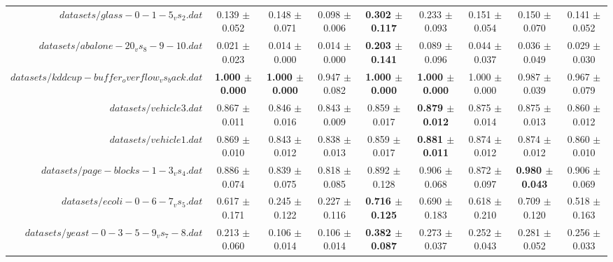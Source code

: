 \begin{table}[!ht]
{\begin{tabular}{r c c c c c c c c}
$datasets/glass-0-1-5_vs_2.dat$ & 0.139 $\pm$ 0.052 & 0.148 $\pm$ 0.071 & 0.098 $\pm$ 0.006 & \textbf{0.302 $\pm$ 0.117} & 0.233 $\pm$ 0.093 & 0.151 $\pm$ 0.054 & 0.150 $\pm$ 0.070 & 0.141 $\pm$ 0.052 \\
$datasets/abalone-20_vs_8-9-10.dat$ & 0.021 $\pm$ 0.023 & 0.014 $\pm$ 0.000 & 0.014 $\pm$ 0.000 & \textbf{0.203 $\pm$ 0.141} & 0.089 $\pm$ 0.096 & 0.044 $\pm$ 0.037 & 0.036 $\pm$ 0.049 & 0.029 $\pm$ 0.030 \\
$datasets/kddcup-buffer_overflow_vs_back.dat$ & \textbf{1.000 $\pm$ 0.000} & \textbf{1.000 $\pm$ 0.000} & 0.947 $\pm$ 0.082 & \textbf{1.000 $\pm$ 0.000} & \textbf{1.000 $\pm$ 0.000} & 1.000 $\pm$ 0.000 & 0.987 $\pm$ 0.039 & 0.967 $\pm$ 0.079 \\
$datasets/vehicle3.dat$ & 0.867 $\pm$ 0.011 & 0.846 $\pm$ 0.016 & 0.843 $\pm$ 0.009 & 0.859 $\pm$ 0.017 & \textbf{0.879 $\pm$ 0.012} & 0.875 $\pm$ 0.014 & 0.875 $\pm$ 0.013 & 0.860 $\pm$ 0.012 \\
$datasets/vehicle1.dat$ & 0.869 $\pm$ 0.010 & 0.843 $\pm$ 0.012 & 0.838 $\pm$ 0.013 & 0.859 $\pm$ 0.017 & \textbf{0.881 $\pm$ 0.011} & 0.874 $\pm$ 0.012 & 0.874 $\pm$ 0.012 & 0.860 $\pm$ 0.010 \\
$datasets/page-blocks-1-3_vs_4.dat$ & 0.886 $\pm$ 0.074 & 0.839 $\pm$ 0.075 & 0.818 $\pm$ 0.085 & 0.892 $\pm$ 0.128 & 0.906 $\pm$ 0.068 & 0.872 $\pm$ 0.097 & \textbf{0.980 $\pm$ 0.043} & 0.906 $\pm$ 0.069 \\
$datasets/ecoli-0-6-7_vs_5.dat$ & 0.617 $\pm$ 0.171 & 0.245 $\pm$ 0.122 & 0.227 $\pm$ 0.116 & \textbf{0.716 $\pm$ 0.125} & 0.690 $\pm$ 0.183 & 0.618 $\pm$ 0.210 & 0.709 $\pm$ 0.120 & 0.518 $\pm$ 0.163 \\
$datasets/yeast-0-3-5-9_vs_7-8.dat$ & 0.213 $\pm$ 0.060 & 0.106 $\pm$ 0.014 & 0.106 $\pm$ 0.014 & \textbf{0.382 $\pm$ 0.087} & 0.273 $\pm$ 0.037 & 0.252 $\pm$ 0.043 & 0.281 $\pm$ 0.052 & 0.256 $\pm$ 0.033 \\
\end{tabular}}
\end{table}
